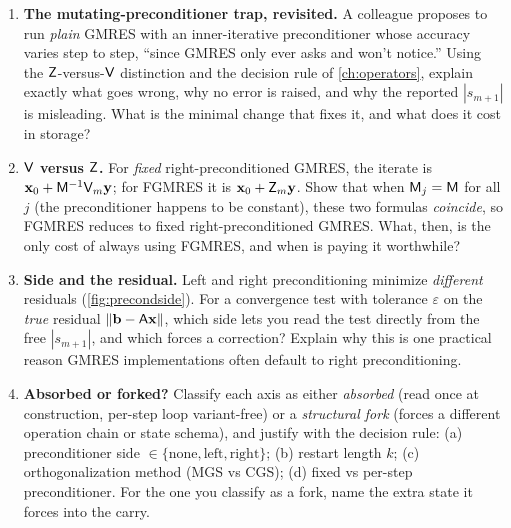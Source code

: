 \begin{enumerate}[nosep]
  \item \textbf{The mutating-preconditioner trap, revisited.} A colleague proposes to
  run \emph{plain} GMRES with an inner-iterative preconditioner whose accuracy varies
  step to step, ``since GMRES only ever asks  and won't notice.''
  Using the $\mathsf{Z}$-versus-$\mathsf{V}$ distinction and the decision rule of
  \cref{ch:operators}, explain exactly what goes wrong, why no error is raised, and why
  the reported $|s_{m+1}|$ is misleading. What is the minimal change that fixes it, and
  what does it cost in storage?

  \item \textbf{$\mathsf{V}$ versus $\mathsf{Z}$.} For \emph{fixed} right-preconditioned GMRES,
  the iterate is $\mathbf{x}_0+\mathsf{M}^{-1}\mathsf{V}_m\mathbf{y}$; for FGMRES it is $\mathbf{x}_0+\mathsf{Z}_m\mathbf{y}$.
  Show that when $\mathsf{M}_j=\mathsf{M}$ for all $j$ (the preconditioner happens to be
  constant), these two formulas \emph{coincide}, so FGMRES reduces to fixed
  right-preconditioned GMRES. What, then, is the only cost of always using FGMRES, and
  when is paying it worthwhile?

  \item \textbf{Side and the residual.} Left and right preconditioning minimize
  \emph{different} residuals (\cref{fig:precondside}). For a convergence test with
  tolerance $\varepsilon$ on the \emph{true} residual $\lVert\mathbf{b}-\mathsf{A}\mathbf{x}\rVert$, which
  side lets you read the test directly from the free $|s_{m+1}|$, and which forces a
  correction? Explain why this is one practical reason GMRES implementations often
  default to right preconditioning.

  \item \textbf{Absorbed or forked?} Classify each axis as either \emph{absorbed} (read
  once at construction, per-step loop variant-free) or a \emph{structural fork} (forces
  a different operation chain or state schema), and justify with the decision rule:
  (a) preconditioner side $\in\{\text{none},\text{left},\text{right}\}$;
  (b) restart length $k$; (c) orthogonalization method (MGS vs CGS); (d)
  fixed vs per-step preconditioner. For the one you classify as a fork, name the extra
  state it forces into the carry.
\end{enumerate}
